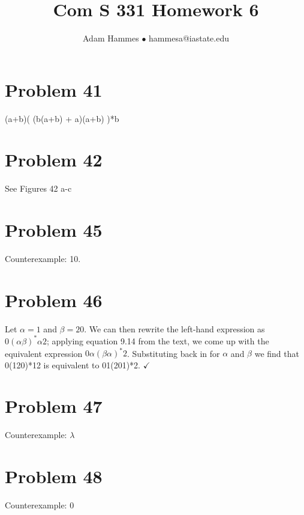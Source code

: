 \documentclass[11pt]{article}
\begin{document}
\title{Com S 331 Homework 6}
\author{Adam Hammes $\bullet$ hammesa@iastate.edu}
\maketitle

\section*{Problem 41}

(a+b)( (b(a+b) + a)(a+b) )*b

\section*{Problem 42}

See Figures 42 a-c

\section*{Problem 45}

Counterexample: 10.

\section*{Problem 46}

Let $\alpha = 1$ and $\beta = 20$. We can then rewrite the left-hand expression as $0(\alpha \beta)^*\alpha2$; applying equation 9.14 from the text, we come up with the equivalent expression 
$0\alpha(\beta \alpha)^*2$. Substituting back in for $\alpha$ and $\beta$ we find that 0(120)*12 is equivalent to 01(201)*2. $ \checkmark $


\section*{Problem 47}

Counterexample: $\lambda$

\section*{Problem 48}

Counterexample: 0
\end{document}
